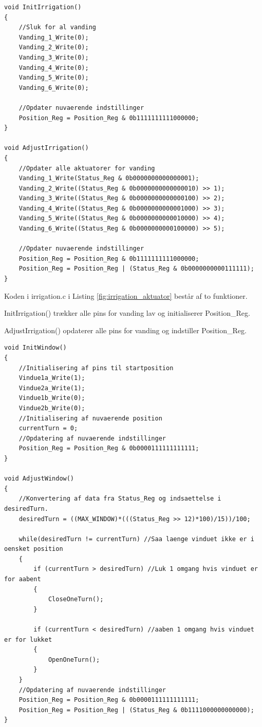 \clearpage

\begin{lstlisting}[caption=Udsnit af irrigation.c for PSoC4 i Aktuator, label=fig:irrigation_aktuator]
void InitIrrigation()
{
    //Sluk for al vanding
    Vanding_1_Write(0);
    Vanding_2_Write(0);
    Vanding_3_Write(0);
    Vanding_4_Write(0);
    Vanding_5_Write(0);
    Vanding_6_Write(0);
    
    //Opdater nuvaerende indstillinger
    Position_Reg = Position_Reg & 0b1111111111000000;
}

void AdjustIrrigation()
{
    //Opdater alle aktuatorer for vanding
    Vanding_1_Write(Status_Reg & 0b0000000000000001);
    Vanding_2_Write((Status_Reg & 0b0000000000000010) >> 1);
    Vanding_3_Write((Status_Reg & 0b0000000000000100) >> 2);
    Vanding_4_Write((Status_Reg & 0b0000000000001000) >> 3);
    Vanding_5_Write((Status_Reg & 0b0000000000010000) >> 4);
    Vanding_6_Write((Status_Reg & 0b0000000000100000) >> 5);
    
    //Opdater nuvaerende indstillinger
    Position_Reg = Position_Reg & 0b1111111111000000;
    Position_Reg = Position_Reg | (Status_Reg & 0b0000000000111111);
}
\end{lstlisting}

Koden i irrigation.c i Listing \ref{fig:irrigation_aktuator} består af to funktioner. 

InitIrrigation() trækker alle pins for vanding lav og initialiserer Position\_Reg.

AdjustIrrigation() opdaterer alle pins for vanding og indstiller Position\_Reg.

\clearpage

\begin{lstlisting}[caption=Udsnit A af window.c for PSoC4 i Aktuator, label=fig:window1_aktuator]
void InitWindow()
{
    //Initialisering af pins til startposition
    Vindue1a_Write(1);
    Vindue2a_Write(1);
    Vindue1b_Write(0);
    Vindue2b_Write(0);
    //Initialisering af nuvaerende position
    currentTurn = 0;
    //Opdatering af nuvaerende indstillinger
    Position_Reg = Position_Reg & 0b0000111111111111;
}

void AdjustWindow()
{      
    //Konvertering af data fra Status_Reg og indsaettelse i desiredTurn.
    desiredTurn = ((MAX_WINDOW)*(((Status_Reg >> 12)*100)/15))/100;
    
    while(desiredTurn != currentTurn) //Saa laenge vinduet ikke er i oensket position
    {
        if (currentTurn > desiredTurn) //Luk 1 omgang hvis vinduet er for aabent
        {
            CloseOneTurn();
        }
    
        if (currentTurn < desiredTurn) //aaben 1 omgang hvis vinduet er for lukket
        {
            OpenOneTurn();
        }
    }
    //Opdatering af nuvaerende indstillinger
    Position_Reg = Position_Reg & 0b0000111111111111;
    Position_Reg = Position_Reg | (Status_Reg & 0b1111000000000000);
}
\end{lstlisting}

